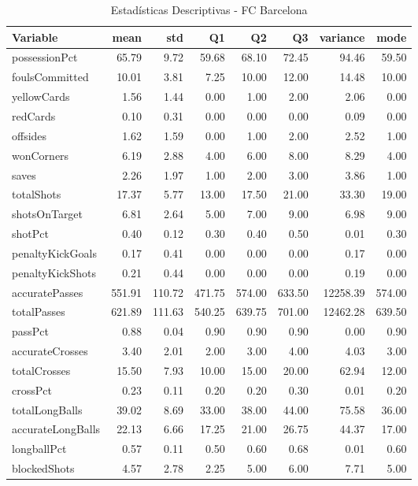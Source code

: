 \begin{table}[H]
\centering
\caption{Estadísticas Descriptivas - FC Barcelona}
\label{tab:esp_barcelona}
\small
\begin{tabular}{lrrrrrrr}
\hline
Variable & mean & std & Q1 & Q2 & Q3 & variance & mode \\
\hline
possessionPct & 65.79 & 9.72 & 59.68 & 68.10 & 72.45 & 94.46 & 59.50 \\
foulsCommitted & 10.01 & 3.81 & 7.25 & 10.00 & 12.00 & 14.48 & 10.00 \\
yellowCards & 1.56 & 1.44 & 0.00 & 1.00 & 2.00 & 2.06 & 0.00 \\
redCards & 0.10 & 0.31 & 0.00 & 0.00 & 0.00 & 0.09 & 0.00 \\
offsides & 1.62 & 1.59 & 0.00 & 1.00 & 2.00 & 2.52 & 1.00 \\
wonCorners & 6.19 & 2.88 & 4.00 & 6.00 & 8.00 & 8.29 & 4.00 \\
saves & 2.26 & 1.97 & 1.00 & 2.00 & 3.00 & 3.86 & 1.00 \\
totalShots & 17.37 & 5.77 & 13.00 & 17.50 & 21.00 & 33.30 & 19.00 \\
shotsOnTarget & 6.81 & 2.64 & 5.00 & 7.00 & 9.00 & 6.98 & 9.00 \\
shotPct & 0.40 & 0.12 & 0.30 & 0.40 & 0.50 & 0.01 & 0.30 \\
penaltyKickGoals & 0.17 & 0.41 & 0.00 & 0.00 & 0.00 & 0.17 & 0.00 \\
penaltyKickShots & 0.21 & 0.44 & 0.00 & 0.00 & 0.00 & 0.19 & 0.00 \\
accuratePasses & 551.91 & 110.72 & 471.75 & 574.00 & 633.50 & 12258.39 & 574.00 \\
totalPasses & 621.89 & 111.63 & 540.25 & 639.75 & 701.00 & 12462.28 & 639.50 \\
passPct & 0.88 & 0.04 & 0.90 & 0.90 & 0.90 & 0.00 & 0.90 \\
accurateCrosses & 3.40 & 2.01 & 2.00 & 3.00 & 4.00 & 4.03 & 3.00 \\
totalCrosses & 15.50 & 7.93 & 10.00 & 15.00 & 20.00 & 62.94 & 12.00 \\
crossPct & 0.23 & 0.11 & 0.20 & 0.20 & 0.30 & 0.01 & 0.20 \\
totalLongBalls & 39.02 & 8.69 & 33.00 & 38.00 & 44.00 & 75.58 & 36.00 \\
accurateLongBalls & 22.13 & 6.66 & 17.25 & 21.00 & 26.75 & 44.37 & 17.00 \\
longballPct & 0.57 & 0.11 & 0.50 & 0.60 & 0.68 & 0.01 & 0.60 \\
blockedShots & 4.57 & 2.78 & 2.25 & 5.00 & 6.00 & 7.71 & 5.00 \\

\end{tabular}
\end{table}
